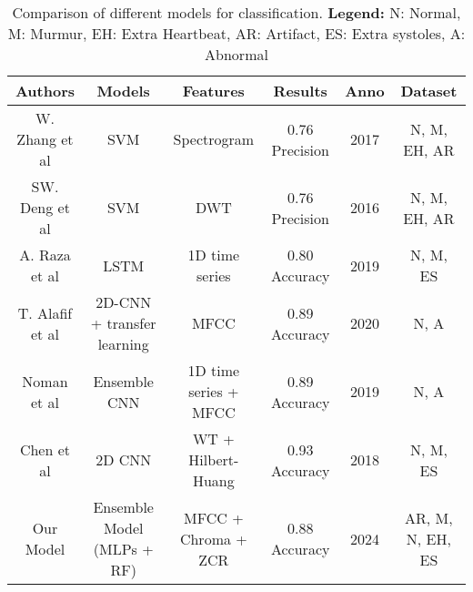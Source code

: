 \begin{table*}[ht!]
    \small
    \centering
    \begin{tabular}{|c|c|c|c|c|c|}
        \hline
        \textbf{Authors}                                                                & \textbf{Models}            & \textbf{Features}     & \textbf{Results} & \textbf{Anno} & \textbf{Dataset} \\ \hline
        W. Zhang et al \cite{Zhang_Han_Deng_2017}                                       & SVM                        & Spectrogram           & 0.76 Precision   & 2017          & N, M, EH, AR     \\ \hline
        SW. Deng et al \cite{Deng_Han_2016}                                             & SVM                        & DWT                   & 0.76 Precision   & 2016          & N, M, EH, AR     \\ \hline
        A. Raza et al \cite{Raza_Mehmood_Ullah_Ahmad_Choi_On_2019}                      & LSTM                       & 1D time series        & 0.80 Accuracy    & 2019          & N, M, ES         \\ \hline
        T. Alafif et al \cite{Alafif_Boulares_Barnawi_Alafif_Althobaiti_Alferaidi_2020} & 2D-CNN + transfer learning & MFCC                  & 0.89 Accuracy    & 2020          & N, A             \\ \hline
        Noman et al \cite{Noman_Ting_Salleh_Ombao_2019}                                 & Ensemble CNN               & 1D time series + MFCC & 0.89 Accuracy    & 2019          & N, A             \\ \hline
        Chen et al \cite{Chen_Ren_Hao_Hu_2018}                                          & 2D CNN                     & WT + Hilbert-Huang    & 0.93 Accuracy    & 2018          & N, M, ES         \\ \hline
        Our Model                                                                       & Ensemble Model (MLPs + RF) & MFCC + Chroma + ZCR   & 0.88 Accuracy    & 2024          & AR, M, N, EH, ES \\ \hline
    \end{tabular}
    \caption{Comparison of different models for classification. \textbf{Legend:} N: Normal, M: Murmur, EH: Extra Heartbeat, AR: Artifact, ES: Extra systoles, A: Abnormal}
\end{table*}